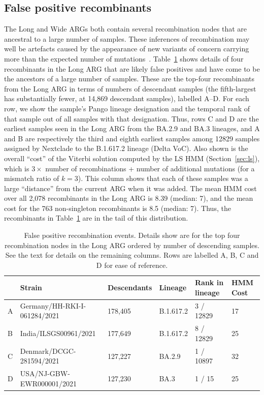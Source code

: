 \documentclass{article}
\begin{document}

\subsection{False positive recombinants}
\label{sec:false_positives}
The Long and Wide ARGs both contain several recombination nodes that are
ancestral to a large number of samples.
These inferences of recombination may well be artefacts
caused by the appearance of new variants of concern carrying
more than the expected number of mutations~\citep{otto2021origins}.
Table~\ref{tab:false_positive} shows details of four recombinants
in the Long ARG that are likely false positives and have come to be
the ancestors of a large number of samples. These are the top-four recombinants
from the Long ARG in terms of numbers of descendant samples
(the fifth-largest has substantially fewer, at 14,869 descendant samples),
labelled A--D.
For each row, we show the sample's Pango lineage
designation and the temporal rank of that sample out of all
samples with that designation. Thus, rows C and D are the earliest
samples seen in the Long ARG from the BA.2.9 and BA.3 lineages,
and A and B are respectively the third and eighth earliest samples among 12829 samples
assigned by Nextclade to the B.1.617.2
lineage (Delta VoC). Also shown is the overall ``cost'' of the Viterbi
solution computed by the LS HMM (Section~\ref{sec:ls}), which
is $3 \times$ number of recombinations + number of additional mutations
(for a mismatch ratio of $k=3$).
This column shows that each of these samples was a large
``distance'' from the current ARG when it was added. The mean
HMM cost over all 2,078 recombinants in the Long ARG is 8.39
(median: 7), and the mean cost for the  763 non-singleton
recombinants is 8.5 (median: 7). Thus, the recombinants in
Table~\ref{tab:false_positive} are in the tail of this distribution.

\begin{table} \centering
\begin{tabular}{llllll}
\toprule
& Strain & Descendants & Lineage & Rank in lineage&HMM Cost \\
\midrule
A&Germany/HH-RKI-I-061284/2021 & 178,405    & B.1.617.2   & 3 / 12829& 17  \\
B&India/ILSGS00961/2021        & 177,649    & B.1.617.2   & 8 / 12829& 25   \\
C&Denmark/DCGC-281594/2021     & 127,227    & BA.2.9      & 1 / 10897& 32 \\
D&USA/NJ-GBW-EWR000001/2021    & 127,230    & BA.3        & 1 / 15& 25 \\
\bottomrule
\end{tabular}
\caption{\label{tab:false_positive}
False positive recombination events. Details show are for the top
four recombination nodes in the Long ARG ordered by number of
descending samples. See the text for details on the remaining columns.
Rows are labelled A, B, C and D for ease of reference.}
\end{table}
\end{document}
